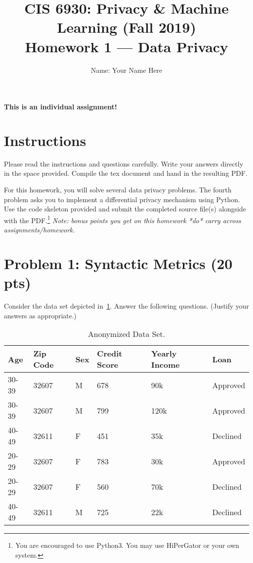 \documentclass[11pt,letterpaper]{article}
\begin{document}
\title{CIS 6930: Privacy \& Machine Learning (Fall 2019) \\Homework 1 --- Data Privacy}

\author{Name: Your Name Here}

\maketitle

\begin{center}
	\color{red}\bf This is an individual assignment!
\end{center}

\section*{Instructions}
%

Please read the instructions and questions carefully. Write your answers directly in the space provided. Compile the tex document and hand in the resulting PDF.

For this homework, you will solve several data privacy problems. The fourth problem asks you to implement a differential privacy mechanism using Python. Use the code skeleton provided and submit the completed source file(s) alongside with the PDF.\footnote{You are encouraged to use Python3. You may use HiPerGator or your own system.} {\em Note: bonus points you get on this homework *do* carry across assignments/homework.}




\newpage
\section*{Problem 1: Syntactic Metrics (20 pts)}
%


Consider the data set depicted in~\cref{tbl:pr1data}. Answer the following questions. (Justify your answers as appropriate.)

\begin{table}[h]
	\centering	
    \begin{tabular}{|l|l|l|l|l|l|}
    \hline
    Age   & Zip Code & Sex & Credit Score & Yearly Income & Loan     \\\hline \hline
    30-39 & 32607    & M   & 678          & 90k           & Approved \\\hline
    30-39 & 32607    & M   & 799          & 120k          & Approved \\\hline
    40-49 & 32611    & F   & 451          & 35k           & Declined \\\hline
    20-29 & 32607    & F   & 783          & 30k           & Approved \\\hline
    20-29 & 32607    & F   & 560          & 70k           & Declined \\\hline
    40-49 & 32611    & M   & 725          & 22k           & Declined \\\hline
    \end{tabular}
    \caption{Anonymized Data Set.}
    \label{tbl:pr1data}
\end{table}
\end{document}
